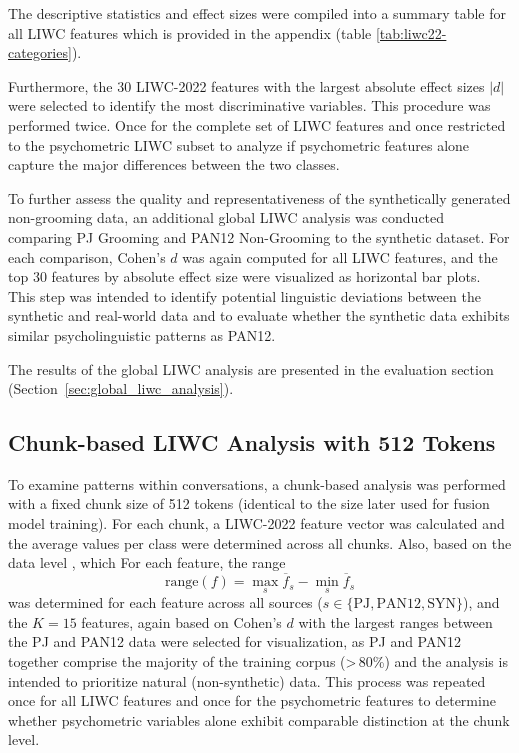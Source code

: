 The descriptive statistics and effect sizes were compiled into a summary table for all LIWC features which is provided in the appendix (table \ref{tab:liwc22-categories}).

Furthermore, the 30 LIWC-2022 features with the largest absolute effect sizes \(|d|\) were selected to identify the most discriminative variables. 
This procedure was performed twice. Once for the complete set of LIWC features and once restricted to the psychometric LIWC subset to analyze if psychometric features alone capture the major differences between the two classes. 

To further assess the quality and representativeness of the synthetically generated non-grooming data, an additional global LIWC analysis was conducted comparing PJ Grooming and PAN12 Non-Grooming to the synthetic dataset. 
For each comparison, Cohen’s \(d\) was again computed for all LIWC features, and the top 30 features by absolute effect size were visualized as horizontal bar plots. 
This step was intended to identify potential linguistic deviations between the synthetic and real-world data and to evaluate whether the synthetic data exhibits similar psycholinguistic patterns as PAN12.

The results of the global LIWC analysis are presented in the evaluation section (Section~\ref{sec:global_liwc_analysis}).

\subsection{Chunk-based LIWC Analysis with 512 Tokens}

To examine patterns within conversations, a chunk-based analysis was performed with a fixed chunk size of 512 tokens (identical to the size later used for fusion model training). For each chunk, a LIWC-2022 feature vector was calculated and the average values per class were determined across all chunks. Also, based on the data level , which
For each feature, the range
\[
\mathrm{range}(f) = \max_{s}\overline{f}_{s} - \min_{s}\overline{f}_ {s}
\]
was determined for each feature across all sources (\(s \in \{\mathrm{PJ}, \mathrm{PAN12}, \mathrm{SYN}\}\)), and the \(K=15\) features, again based on Cohen's \(d\) \cite{cohen1988} with the largest ranges between the PJ and PAN12 data were selected for visualization, as PJ and PAN12 together comprise the majority of the training corpus (>\,80\%) and the analysis is intended to prioritize natural (non-synthetic) data.  This process was repeated once for all LIWC features and once for the psychometric features to determine whether psychometric variables alone exhibit comparable distinction at the chunk level.

